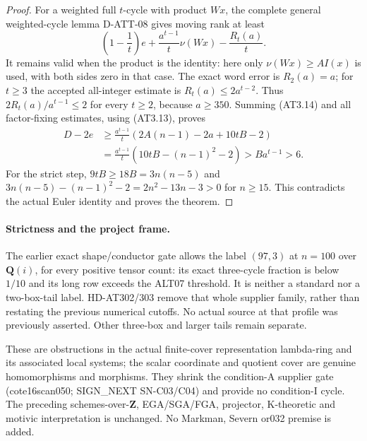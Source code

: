 \begin{proof}
For a weighted full $t$-cycle with product $Wx$, the complete
general weighted-cycle lemma D-ATT-08 gives moving rank at least
\[
 \left(1-\frac1t\right)e
     +\frac{a^{t-1}}t\nu(Wx)-\frac{R_t(a)}t.              \tag{AT3.14}
\]
It remains valid when the product is the identity: here only
$\nu(Wx)\ge A I(x)$ is used, with both sides zero in that case.
The exact word error is $R_2(a)=a$; for $t\ge3$ the accepted
all-integer estimate is $R_t(a)\le2a^{t-2}$.  Thus
$2R_t(a)/a^{t-1}\le2$ for every $t\ge2$, because $a\ge350$.
Summing (AT3.14) and all factor-fixing estimates, using
(AT3.13), proves
\[
 \begin{split}
 D-2e
 &\ge\frac{a^{t-1}}t
       \left(2A(n-1)-2a+10tB-2\right)\\
 &=\frac{a^{t-1}}t\left(10tB-(n-1)^2-2\right)
   >B a^{t-1}>6.                                         \tag{AT3.15}
 \end{split}
\]
For the strict step, $9tB\ge18B=3n(n-5)$ and
$3n(n-5)-(n-1)^2-2=2n^2-13n-3>0$ for $n\ge15$.
This contradicts the actual Euler identity and proves the theorem.
\end{proof}

\paragraph{Strictness and the project frame.}
The earlier exact shape/conductor gate allows the label $(97,3)$
at $n=100$ over $\mathbf Q(i)$, for every positive tensor count:
its exact three-cycle fraction is below $1/10$ and its long row
exceeds the ALT07 threshold.  It is neither a standard nor a
two-box-tail label.  HD-AT302/303 remove that whole supplier
family, rather than restating the previous numerical cutoffs.
No actual source at that profile was previously asserted.
Other three-box and larger tails remain separate.

These are obstructions in the actual finite-cover representation
lambda-ring and its associated local systems; the scalar coordinate
and quotient cover are genuine homomorphisms and morphisms.
They shrink the condition-A supplier gate (cote16scan050;
SIGN_NEXT SN-C03/C04) and provide no condition-I cycle.
The preceding schemes-over-$\mathbf Z$, EGA/SGA/FGA, projector,
K-theoretic and motivic interpretation is unchanged.
No Markman, Severn or032 premise is added.

